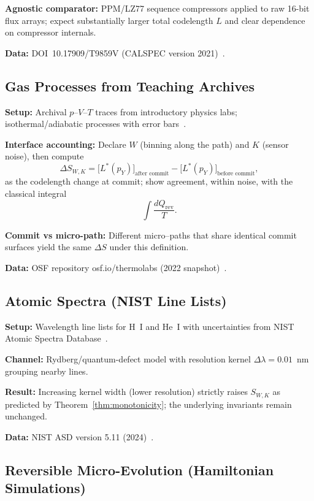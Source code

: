 \documentclass[11pt,letterpaper]{article}
\theoremstyle{definition}
\theoremstyle{remark}
\begin{document}
\textbf{Agnostic comparator:} PPM/LZ77 sequence compressors applied to raw 16-bit flux arrays; expect substantially larger total codelength \(L\) and clear dependence on compressor internals.

\textbf{Data:} DOI~10.17909/T9859V (CALSPEC version 2021)~\cite{CALSPEC2021}.

\subsection{Gas Processes from Teaching Archives}

\textbf{Setup:} Archival \(p\)--\(V\)--\(T\) traces from introductory physics labs; isothermal/adiabatic processes with error bars~\cite{TeachingArchive_Thermo}.

\textbf{Interface accounting:} Declare \(W\) (binning along the path) and \(K\) (sensor noise), then compute
\[
\Delta S_{W,K}=\big[L^\ast(p_Y)\big]_{\text{after commit}}-\big[L^\ast(p_Y)\big]_{\text{before commit}},
\]
as the codelength change at commit; show agreement, within noise, with the classical integral
\[
\int \frac{dQ_{\mathrm{rev}}}{T}.
\]

\textbf{Commit vs micro-path:} Different micro--paths that share identical commit surfaces yield the same \(\Delta S\) under this definition.

\textbf{Data:} OSF repository osf.io/thermolabs (2022 snapshot)~\cite{OSF_ThermoLabs}.

\subsection{Atomic Spectra (NIST Line Lists)}

\textbf{Setup:} Wavelength line lists for H~I and He~I with uncertainties from NIST Atomic Spectra Database~\cite{NIST_ASD}.

\textbf{Channel:} Rydberg/quantum-defect model with resolution kernel \(\Delta\lambda = 0.01\)~nm grouping nearby lines.

\textbf{Result:} Increasing kernel width (lower resolution) strictly raises \(S_{W,K}\) as predicted by Theorem~\ref{thm:monotonicity}; the underlying invariants remain unchanged.

\textbf{Data:} NIST ASD version 5.11 (2024)~\cite{NIST_ASD}.

\subsection{Reversible Micro-Evolution (Hamiltonian Simulations)}
\end{document}
